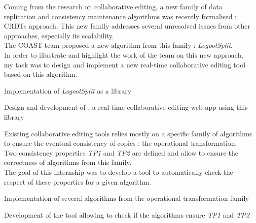 \documentclass[]{deedy-resume-openfont}
\begin{document}
\hfill\begin{minipage}{\dimexpr\textwidth-0.5cm}
Coming from the research on collaborative editing, a new family of data replication and consistency maintenance algorithms
was recently formalised : \acfp{CRDT} approach.
This new family addresses several unresolved issues from other approaches, especially its scalability.
\\
The COAST team proposed a new algorithm from this family : \emph{LogootSplit}.
\\
In order to illustrate and highlight the work of the team on this new approach,
my task was to design and implement a new real-time collaborative editing tool based on this algorithm.
\begin{tightemize}
\item Implementation of \emph{LogootSplit} as a library
\item Design and development of \href{https://www.coedit.re}{}, a real-time collaborative editing web app using this library
\end{tightemize}
\sectionsep\xdef\tpd{\the\prevdepth}
\end{minipage}

\sectionsep

\hfill\begin{minipage}{\dimexpr\textwidth-0.5cm}
Existing collaborative editing tools relies mostly on a specific family of algorithms
to ensure the eventual consistency of copies : the operational transformation.
\\
Two consistency properties \emph{TP1} and \emph{TP2} are defined and allow to ensure the correctness of algorithms from this family.
\\
The goal of this internship was to develop a tool to automatically check the respect of these properties for a given algorithm.
\begin{tightemize}
\item Implementation of several algorithms from the operational transformation family
\item Development of the tool allowing to check if the algorithms ensure \emph{TP1} and \emph{TP2}
\end{tightemize}
\sectionsep\xdef\tpd{\the\prevdepth}
\end{minipage}
\end{document}
